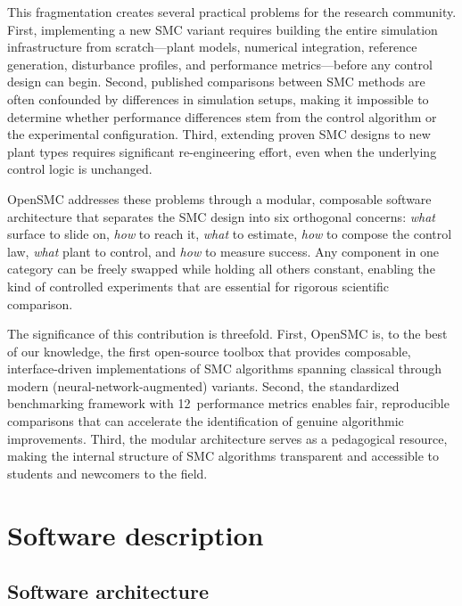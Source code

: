 \documentclass[preprint,12pt]{elsarticle}
\begin{document}
This fragmentation creates several practical problems for the research community. First, implementing a new SMC variant requires building the entire simulation infrastructure from scratch---plant models, numerical integration, reference generation, disturbance profiles, and performance metrics---before any control design can begin. Second, published comparisons between SMC methods are often confounded by differences in simulation setups, making it impossible to determine whether performance differences stem from the control algorithm or the experimental configuration. Third, extending proven SMC designs to new plant types requires significant re-engineering effort, even when the underlying control logic is unchanged.

OpenSMC addresses these problems through a modular, composable software architecture that separates the SMC design into six orthogonal concerns: \emph{what} surface to slide on, \emph{how} to reach it, \emph{what} to estimate, \emph{how} to compose the control law, \emph{what} plant to control, and \emph{how} to measure success. Any component in one category can be freely swapped while holding all others constant, enabling the kind of controlled experiments that are essential for rigorous scientific comparison.

The significance of this contribution is threefold. First, OpenSMC is, to the best of our knowledge, the first open-source toolbox that provides composable, interface-driven implementations of SMC algorithms spanning classical through modern (neural-network-augmented) variants. Second, the standardized benchmarking framework with 12~performance metrics enables fair, reproducible comparisons that can accelerate the identification of genuine algorithmic improvements. Third, the modular architecture serves as a pedagogical resource, making the internal structure of SMC algorithms transparent and accessible to students and newcomers to the field.


\section{Software description}
\label{sec:description}

\subsection{Software architecture}
\label{sec:architecture}
\end{document}
